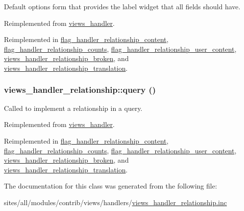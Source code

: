 Default options form that provides the label widget that all fields should have. 

Reimplemented from \hyperlink{classviews__handler_a41fcf16b177eb03e35facbae6320f74}{views\_\-handler}.

Reimplemented in \hyperlink{classflag__handler__relationship__content_16476e401490907a6fadc9af5156d83f}{flag\_\-handler\_\-relationship\_\-content}, \hyperlink{classflag__handler__relationship__counts_a99b83dd638a7e41aeaff5ae9c013efe}{flag\_\-handler\_\-relationship\_\-counts}, \hyperlink{classflag__handler__relationship__user__content_21d3592facff0d6f32b52685f78259b7}{flag\_\-handler\_\-relationship\_\-user\_\-content}, \hyperlink{classviews__handler__relationship__broken_a421a42866d049732e8747669466ae0e}{views\_\-handler\_\-relationship\_\-broken}, and \hyperlink{classviews__handler__relationship__translation_ca4668f3619b0fc6182e12cbaf38b633}{views\_\-handler\_\-relationship\_\-translation}.\hypertarget{classviews__handler__relationship_7dc0b6371807dbf06efa594cb52b3348}{
\subsubsection[{query}]{\setlength{\rightskip}{0pt plus 5cm}views\_\-handler\_\-relationship::query ()}}
\label{classviews__handler__relationship_7dc0b6371807dbf06efa594cb52b3348}


Called to implement a relationship in a query. 

Reimplemented from \hyperlink{classviews__handler_91e22c95696d9fdb9ed753a10d42a21d}{views\_\-handler}.

Reimplemented in \hyperlink{classflag__handler__relationship__content_7fcb01763f0902dafd9f601c0bc1a612}{flag\_\-handler\_\-relationship\_\-content}, \hyperlink{classflag__handler__relationship__counts_18060bfeb86c50ff51325f4dbeb93663}{flag\_\-handler\_\-relationship\_\-counts}, \hyperlink{classflag__handler__relationship__user__content_d6d40590ad33616b0a55395d60d1166b}{flag\_\-handler\_\-relationship\_\-user\_\-content}, \hyperlink{classviews__handler__relationship__broken_58db24781460cd5b36c08c56df9d56ab}{views\_\-handler\_\-relationship\_\-broken}, and \hyperlink{classviews__handler__relationship__translation_f1e8ba159a9b04199ff03cad304ca1e4}{views\_\-handler\_\-relationship\_\-translation}.

The documentation for this class was generated from the following file:\begin{CompactItemize}
\item 
sites/all/modules/contrib/views/handlers/\hyperlink{views__handler__relationship_8inc}{views\_\-handler\_\-relationship.inc}\end{CompactItemize}
